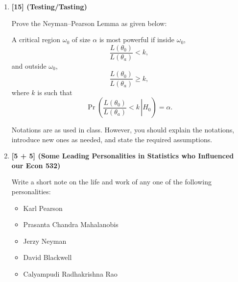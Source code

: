 \documentclass[11pt]{article}
\begin{document}
\begin{enumerate}[label=\arabic*.,leftmargin=*,itemsep=1.5em]
\begin{enumerate}[label=(\roman*),leftmargin=2em]
\item Consider the MLE of $\theta$, $\hat\theta$. Using the result that
$\hat\theta\xrightarrow{p}\theta$, show
\[
\sqrt{n}(\hat\theta-\theta)\xrightarrow{D}
N\!\left(0,\frac{1}{\nu(\theta)}\right),
\]
where
\[
\nu(\theta)=
E\!\left[\left(\frac{d\log f(x,\theta)}{d\theta}\right)^2\right]
=E\!\left[-\frac{d^2\log f(x,\theta)}{d\theta^2}\right].
\]
In your proof you must state all the assumptions and results you use.

\textit{Hint:} Use the following Taylor series expansion:
\[
0=\left.\frac{1}{n}\frac{d\ell(\theta)}{d\theta}\right|_{\theta=\hat\theta}
=\frac{1}{n}\frac{d\ell(\theta)}{d\theta}
+\left.\frac{1}{n}\frac{d^2\ell(\theta)}{d\theta^2}\right|_{\theta=\theta^*}
(\hat\theta-\theta),
\]
where $\ell(\theta)$ is the log-likelihood function and $\theta^*$ lies
between the true value $\theta$ and $\hat\theta$.

\item Interpret the result in (i) in terms of efficiency of $\hat\theta$.
\end{enumerate}

\item \textbf{[15] (Testing/Tasting)}

Prove the Neyman--Pearson Lemma as given below:

A critical region $\omega_0$ of size $\alpha$ is most powerful if inside
$\omega_0$,
\[
\frac{L(\theta_0)}{L(\theta_a)}<k,
\]
and outside $\omega_0$,
\[
\frac{L(\theta_0)}{L(\theta_a)}\geq k,
\]
where $k$ is such that
\[
\Pr\!\left(\left.\frac{L(\theta_0)}{L(\theta_a)}<k\,\right|H_0\right)=\alpha.
\]

Notations are as used in class. However, you should explain the notations,
introduce new ones as needed, and state the required assumptions.

\item \textbf{[5 + 5] (Some Leading Personalities in Statistics who Influenced our Econ 532)}

Write a short note on the life and work of any one of the following
personalities:

\begin{itemize}[itemsep=0pt,topsep=0pt]
\item Karl Pearson
\item Prasanta Chandra Mahalanobis
\item Jerzy Neyman
\item David Blackwell
\item Calyampudi Radhakrishna Rao
\end{itemize}

\end{enumerate}
\end{document}
